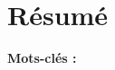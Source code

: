 \documentclass{rapport_stage}
\begin{document}
\cleardoublepage


\listoffigures
\cleardoublepage

\listoftables
\cleardoublepage

\newpage
\printglossaries

\cleardoublepage
\renewcommand{\thesubsection}{\Roman{subsection}}



\cleardoublepage
\thispagestyle{empty}

\section*{Résumé}
{}



{\bf Mots-clés :}
\end{document}
